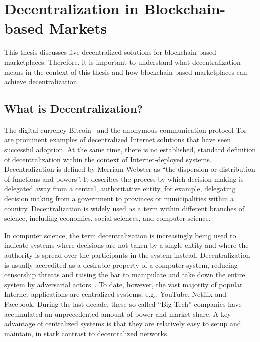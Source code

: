 \section{Decentralization in Blockchain-based Markets}
\label{sec:decentralization}
This thesis discusses five decentralized solutions for blockchain-based marketplaces.
Therefore, it is important to understand what decentralization means in the context of this thesis and how blockchain-based marketplaces can achieve decentralization.

\subsection{What is Decentralization?}
The digital currency Bitcoin~\cite{nakamoto2008bitcoin}  and the anonymous communication protocol Tor~\cite{syverson2004tor} are prominent examples of decentralized Internet solutions that have seen successful adoption.
At the same time, there is no established, standard definition of decentralization within the context of Internet-deployed systems.
Decentralization is defined by Merriam-Webster as \enquote{the dispersion or distribution of functions and powers}.
It describes the process by which decision making is delegated away from a central, authoritative entity, for example, delegating decision making from a government to provinces or municipalities within a country.
Decentralization is widely used as a term within different branches of science, including economics, social sciences, and computer science.

In computer science, the term decentralization is increasingly being used to indicate systems where decisions are not taken by a single entity and where the authority is spread over the participants in the system instead.
Decentralization is usually accredited as a desirable property of a computer system, reducing censorship threats and raising the bar to manipulate and take down the entire system by adversarial actors~\cite{troncoso2017systematizing}.
To date, however, the vast majority of popular Internet applications are centralized systems, e.g., YouTube, Netflix and Facebook.
During the last decade, these so-called \enquote{Big Tech} companies have accumulated an unprecedented amount of power and market share.
A key advantage of centralized systems is that they are relatively easy to setup and maintain, in stark contrast to decentralized networks.

